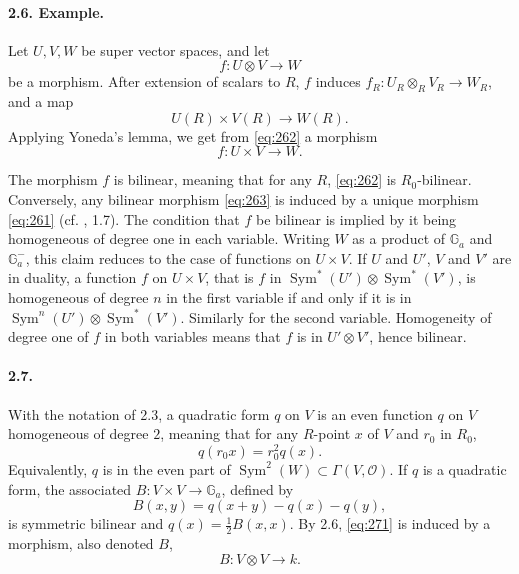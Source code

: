 \documentclass[11pt]{article}
\newcommand{\Sym}{\operatorname{Sym}}
\newcommand{\Ga}{\mathbb G_a}
\newcommand{\calO}{\mathcal O}
\begin{document}
\paragraph{2.6. Example.}
Let $U,V,W$ be super vector spaces, and let
\begin{equation}
\label{eq:261}
f:U\otimes V\longrightarrow W
\end{equation}
be a morphism. After extension of scalars to $R$, $f$ induces $f_R:U_R\otimes_R V_R\to W_R$, and a map
\begin{equation}
\label{eq:262}
U(R)\times V(R)\longrightarrow W(R).
\end{equation}
Applying Yoneda's lemma, we get from \eqref{eq:262} a morphism
\begin{equation}
\label{eq:263}
f:U\times V\longrightarrow W.
\end{equation}

The morphism $f$ is bilinear, meaning that for any $R$, \eqref{eq:262} is $R_0$-bilinear. Conversely, any bilinear morphism \eqref{eq:263} is induced by a unique morphism \eqref{eq:261} (cf. \cite{DM99}, 1.7). The condition that $f$ be bilinear is implied by it being homogeneous of degree one in each variable. Writing $W$ as a product of $\Ga$ and $\Ga^-$, this claim reduces to the case of functions on $U\times V$. If $U$ and $U'$, $V$ and $V'$ are in duality, a function $f$ on $U\times V$, that is $f$ in $\Sym^*(U')\otimes\Sym^*(V')$, is homogeneous of degree $n$ in the first variable if and only if it is in $\Sym^n(U')\otimes\Sym^*(V')$. Similarly for the second variable. Homogeneity of degree one of $f$ in both variables means that $f$ is in $U'\otimes V'$, hence bilinear.

\paragraph{2.7.}
With the notation of 2.3, a quadratic form $q$ on $V$ is an even function $q$ on $V$ homogeneous of degree $2$, meaning that for any $R$-point $x$ of $V$ and $r_0$ in $R_0$,
\[
q(r_0x)=r_0^2q(x).
\]
Equivalently, $q$ is in the even part of $\Sym^2(W)\subset\Gamma(V,\calO)$. If $q$ is a quadratic form, the associated $B:V\times V\to\Ga$, defined by
\begin{equation}
\label{eq:271}
B(x,y)=q(x+y)-q(x)-q(y),
\end{equation}
is symmetric bilinear and $q(x)=\tfrac12B(x,x)$. By 2.6, \eqref{eq:271} is induced by a morphism, also denoted $B$,
\begin{equation}
\label{eq:272}
B:V\otimes V\longrightarrow k.
\end{equation}
\end{document}
